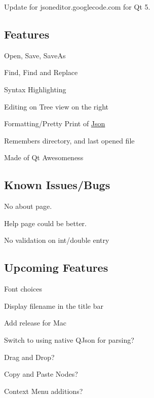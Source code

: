 Update for jsoneditor.\+googlecode.\+com for Qt 5.



\subsection*{Features }


\begin{DoxyItemize}
\item Open, Save, Save\+As
\item Find, Find and Replace
\item Syntax Highlighting
\item Editing on Tree view on the right
\item Formatting/\+Pretty Print of \hyperlink{namespace_json}{Json}
\item Remembers directory, and last opened file
\item Made of Qt Awesomeness
\end{DoxyItemize}

\subsection*{Known Issues/\+Bugs }


\begin{DoxyItemize}
\item No about page.
\item Help page could be better.
\item No validation on int/double entry
\end{DoxyItemize}

\subsection*{Upcoming Features }


\begin{DoxyItemize}
\item Font choices
\item Display filename in the title bar
\item Add release for Mac
\item Switch to using native Q\+Json for parsing?
\item Drag and Drop?
\item Copy and Paste Nodes?
\item Context Menu additions? 
\end{DoxyItemize}